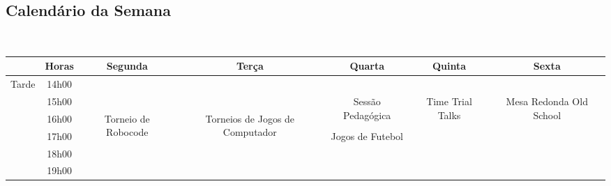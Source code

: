 \subsection{Calendário da Semana}
~\\
\begin{center}
\begin{tabular}{|c||c|c|c|c|c|c|}
\hline
            & Horas & Segunda  & Terça    & Quarta  & Quinta  & Sexta    \\ \hline\hline
\multirow{6}{*}{Tarde}   & 14h00 &        &        &         &      &        \\ \cline{2-7}
             & 15h00 &       &        &
\multirow{2}{*}{\parbox{2.5cm}{\centering Sessão Pedagógica}}
                                       &
\multirow{5}{*}{\parbox{2.5cm}{\centering Time Trial Talks}}
                                        &
\multirow{5}{*}{\parbox{2.5cm}{\centering Mesa Redonda Old School}}
                                                 \\ \cline{2-4}
             & 16h00 &
\multirow{4}{*}{\parbox{2.5cm}{\centering Torneio de Robocode}}
                       &
\multirow{4}{*}{\parbox{2.5cm}{\centering Torneios de Jogos de Computador}}
                              &      &      &      \\ \cline{2-2} \cline{5-5}
             & 17h00 &      &      &
\multirow{3}{*}{\parbox{2.5cm}{\centering Jogos de Futebol}}
                                       &      &      \\ \cline{2-2}
             & 18h00 &        &        &         &      &        \\ \cline{2-2}
             & 19h00 &        &        &         &      &        \\  \hline\hline



\end{tabular}
\end{center}
